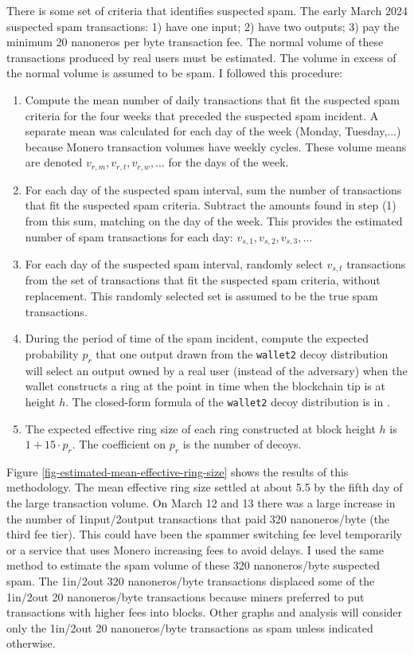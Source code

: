 \documentclass[usletter,11pt,english,openany]{article}
\begin{document}
There is some set of criteria that identifies suspected spam. The
early March 2024 suspected spam transactions: 1) have one input; 2)
have two outputs; 3) pay the minimum 20 nanoneros per byte transaction
fee. The normal volume of these transactions produced by real users
must be estimated. The volume in excess of the normal volume is assumed
to be spam. I followed this procedure:
\begin{enumerate}
\item Compute the mean number of daily transactions that fit the suspected
spam criteria for the four weeks that preceded the suspected spam
incident. A separate mean was calculated for each day of the week
(Monday, Tuesday,...) because Monero transaction volumes have weekly
cycles. These volume means are denoted $v_{r,m},v_{r,t},v_{r,w},\ldots$
for the days of the week.
\item For each day of the suspected spam interval, sum the number of transactions
that fit the suspected spam criteria. Subtract the amounts found in
step (1) from this sum, matching on the day of the week. This provides
the estimated number of spam transactions for each day: $v_{s,1},v_{s,2},v_{s,3},\ldots$
\item For each day of the suspected spam interval, randomly select $v_{s,t}$
transactions from the set of transactions that fit the suspected spam
criteria, without replacement. This randomly selected set is assumed
to be the true spam transactions.
\item During the period of time of the spam incident, compute the expected
probability $p_{r}$ that one output drawn from the \texttt{wallet2}
decoy distribution will select an output owned by a real user (instead
of the adversary) when the wallet constructs a ring at the point in
time when the blockchain tip is at height $h$. The closed-form formula
of the \texttt{wallet2} decoy distribution is in \cite{Rucknium2023a}.
\item The expected effective ring size of each ring constructed at block
height $h$ is $1+15\cdot p_{r}$. The coefficient on $p_{r}$ is
the number of decoys.
\end{enumerate}
Figure \ref{fig-estimated-mean-effective-ring-size} shows the results
of this methodology. The mean effective ring size settled at about
5.5 by the fifth day of the large transaction volume. On March 12
and 13 there was a large increase in the number of 1input/2output
transactions that paid 320 nanoneros/byte (the third fee tier). This
could have been the spammer switching fee level temporarily or a service
that uses Monero increasing fees to avoid delays. I used the same
method to estimate the spam volume of these 320 nanoneros/byte suspected
spam. The 1in/2out 320 nanoneros/byte transactions displaced some
of the 1in/2out 20 nanoneros/byte transactions because miners preferred
to put transactions with higher fees into blocks. Other graphs and
analysis will consider only the 1in/2out 20 nanoneros/byte transactions
as spam unless indicated otherwise.
\end{document}
